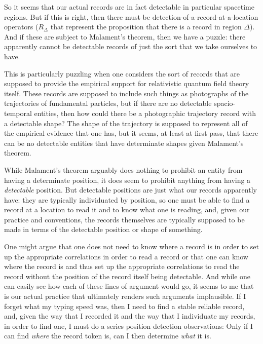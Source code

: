 \documentclass [12pt]{article}
\begin{document}
So it seems that our actual records are in fact
detectable in particular spacetime regions.  But if this is right,
then there must be detection-of-a-record-at-a-location operators
($R_\Delta$ that represent the proposition that there is a record in region
$\Delta$).  And if these are subject to Malament's theorem, then we have a
puzzle: there apparently cannot be detectable records of just the sort
that we take ourselves to have.

This is particularly puzzling when one considers the sort of 
records that are supposed to provide the empirical support for relativistic
quantum field theory itself.  These records are supposed to include
such things as photographs of the trajectories of fundamental particles,
but if there are no detectable spacio-temporal
entities, then how could there be a photographic trajectory record with
a detectable shape?  The shape of the trajectory is supposed to represent
all of the empirical evidence that one has, but it seems, at least at first 
pass, that there can be no detectable entities that have determinate
shapes given Malament's theorem.


While Malament's theorem arguably does nothing to prohibit an entity from
having a determinate position, it does seem to prohibit anything from having a
{\em detectable} position.  But detectable positions are just what our records
apparently have: they are typically individuated by position,
so one must be able to find a record at a location to read it and to
know what one is reading, and, given our practice and conventions,
the records themselves are typically supposed to be
made in terms of the detectable position or shape of something.


One might argue that one does not need to know
where a record is in order to set up the appropriate correlations
in order to read a record or that one
can know where the record is and thus set up the appropriate correlations
to read the record without the position of the record itself being detectable.
And while one can easily see how each of these lines of argument would
go, it seems to me that is our actual practice that ultimately renders
such arguments implausible.  If I forget what my typing speed was, then I need to
find a stable reliable record, and, given the way that I
recorded it and the way that I individuate my records, in order to find one, I
must do a series position detection observations: Only if I can
find {\em where\/} the record token is, can I
then determine {\em what\/} it is.
\end{document}

